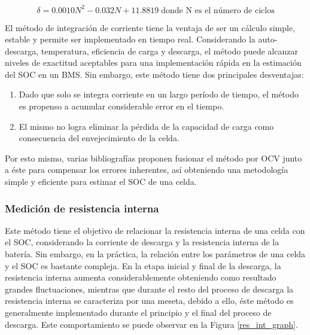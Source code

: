 \begin{equation}
    \delta = 0.0010N^2 - 0.032N + 11.8819\label{batt_cap_correction}\;
    \text{donde N es el n\'umero de ciclos}
\end{equation}

\noindent El m\'etodo de integraci\'on de corriente tiene la ventaja de ser un
c\'alculo simple, estable y permite ser implementado en tiempo real.
Considerando la auto-descarga, temperatura, eficiencia de carga y descarga, el
m\'etodo puede alcanzar niveles de exactitud aceptables para una
implementaci\'on r\'apida en la estimaci\'on del \acrshort{SOC} en un BMS. Sin
embargo, este m\'etodo tiene dos principales desventajas:

\begin{enumerate}
    \item Dado que solo se integra corriente en un largo per\'iodo de tiempo, el
        m\'etodo es propenso a acumular considerable error en el tiempo.
    \item El mismo no logra eliminar la p\'erdida de la capacidad de carga como
        consecuencia del envejecimiento de la celda.
\end{enumerate}

\noindent Por esto mismo, varias bibliograf\'ias proponen fusionar el m\'etodo
por \acrshort{OCV} junto a \'este para compensar los errores inherentes, as\'i
obteniendo una metodolog\'ia simple y eficiente para estimar el \acrshort{SOC}
de una celda.

\subsubsection{Medici\'on de resistencia interna}\label{internalRMethod}

\noindent Este m\'etodo tiene el objetivo de relacionar la resistencia interna
de una celda con el \acrshort{SOC}, considerando la corriente de descarga y la
resistencia interna de la bater\'ia. Sin embargo, en la pr\'actica, la
relaci\'on entre los par\'ametros de una celda y el \acrshort{SOC} es bastante
compleja. En la etapa inicial y final de la descarga, la resistencia interna
aumenta considerablemente obteniendo como resultado grandes fluctuaciones,
mientras que durante el resto del proceso de descarga la resistencia interna se
caracteriza por una meseta, debido a ello, \'este m\'etodo es generalmente
implementado durante el principio y el final del proceso de descarga. Este 
comportamiento se puede observar en la Figura \ref{res_int_graph}.

